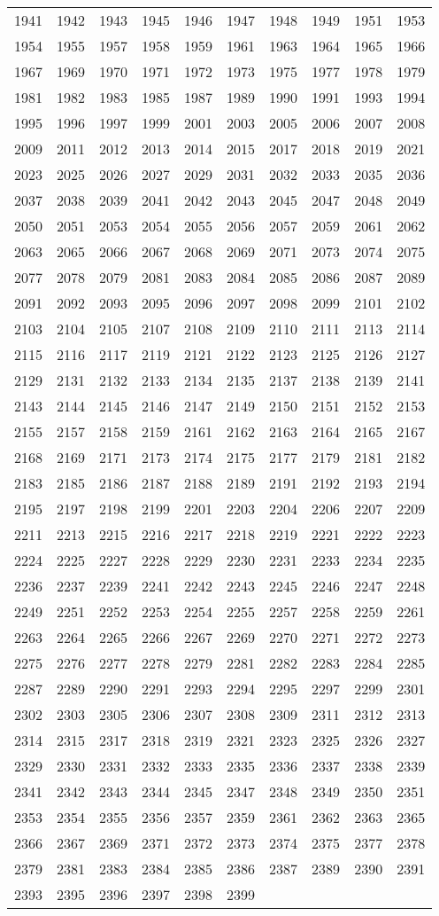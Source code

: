 \begin{longtable}{*{10}{l}}
1941&1942&1943&1945&1946&1947&1948&1949&1951&1953\\
1954&1955&1957&1958&1959&1961&1963&1964&1965&1966\\
1967&1969&1970&1971&1972&1973&1975&1977&1978&1979\\
1981&1982&1983&1985&1987&1989&1990&1991&1993&1994\\
1995&1996&1997&1999&2001&2003&2005&2006&2007&2008\\
2009&2011&2012&2013&2014&2015&2017&2018&2019&2021\\
2023&2025&2026&2027&2029&2031&2032&2033&2035&2036\\
2037&2038&2039&2041&2042&2043&2045&2047&2048&2049\\
2050&2051&2053&2054&2055&2056&2057&2059&2061&2062\\
2063&2065&2066&2067&2068&2069&2071&2073&2074&2075\\
2077&2078&2079&2081&2083&2084&2085&2086&2087&2089\\
2091&2092&2093&2095&2096&2097&2098&2099&2101&2102\\
2103&2104&2105&2107&2108&2109&2110&2111&2113&2114\\
2115&2116&2117&2119&2121&2122&2123&2125&2126&2127\\
2129&2131&2132&2133&2134&2135&2137&2138&2139&2141\\
2143&2144&2145&2146&2147&2149&2150&2151&2152&2153\\
2155&2157&2158&2159&2161&2162&2163&2164&2165&2167\\
2168&2169&2171&2173&2174&2175&2177&2179&2181&2182\\
2183&2185&2186&2187&2188&2189&2191&2192&2193&2194\\
2195&2197&2198&2199&2201&2203&2204&2206&2207&2209\\
2211&2213&2215&2216&2217&2218&2219&2221&2222&2223\\
2224&2225&2227&2228&2229&2230&2231&2233&2234&2235\\
2236&2237&2239&2241&2242&2243&2245&2246&2247&2248\\
2249&2251&2252&2253&2254&2255&2257&2258&2259&2261\\
2263&2264&2265&2266&2267&2269&2270&2271&2272&2273\\
2275&2276&2277&2278&2279&2281&2282&2283&2284&2285\\
2287&2289&2290&2291&2293&2294&2295&2297&2299&2301\\
2302&2303&2305&2306&2307&2308&2309&2311&2312&2313\\
2314&2315&2317&2318&2319&2321&2323&2325&2326&2327\\
2329&2330&2331&2332&2333&2335&2336&2337&2338&2339\\
2341&2342&2343&2344&2345&2347&2348&2349&2350&2351\\
2353&2354&2355&2356&2357&2359&2361&2362&2363&2365\\
2366&2367&2369&2371&2372&2373&2374&2375&2377&2378\\
2379&2381&2383&2384&2385&2386&2387&2389&2390&2391\\
2393&2395&2396&2397&2398&2399&\\
\bottomrule\end{longtable}
